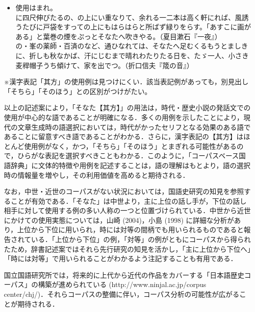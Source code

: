 \documentclass[japanese]{jnlp_1.4}
\begin{document}
\begin{itemize}
\begin{itemize}
\setlength{\fboxsep}{1pt}
\item[\textbullet]
使用はまれ。\\
に四尺伸びたるの、の上にい重なりて、余れる一二本は高く軒にれば、風誘うたびに戸袋をすっての上にもはらはらと所ばず緑りをらす。「あすこに画がある」と葉巻の煙をぷっと\colorbox[gray]{.9}{そなた}へ吹きやる。（夏目漱石『一夜』）\\
の・峯の薬師・百済のなど、通ひなれては、\colorbox[gray]{.9}{そなた}へ足むくるもうとましきに、折しも秋なかば、汗にじむまで晴れわたりたる日を、たゞ一人、小さき麦稈帽子うち傾けて、家を出でつ。（折口信夫『筬の音』）
\end{itemize}
※漢字表記「其方」の使用例は見つけにくい．該当表記例があっても，別見出し「そちら」「そのほう」との区別がつけがたい。
\end{itemize}

以上の記述案により，「そなた【其方】」の用法は，時代・歴史小説の発話文での使用が中心的な語であることが明確になる．多くの用例を示したことにより，現代の文章生成時の語選択においては，時代がかったセリフとなる効果のある語であることに留意すべき語であることがわかる．さらに，漢字表記の【其方】はほとんど使用例がなく，かつ，「そちら」「そのほう」とまぎれる可能性があるので，ひらがな表記を選択すべきこともわかる．このように，「コーパスベース国語辞典」に文体的特徴や用例を記述することは，語の理解はもとより，語の選択時の情報量を増やし，その利用価値を高めると期待される．

なお，中世・近世のコーパスがない状況においては，国語史研究の知見を参照することが有効である．「そなた」は中世より，主に上位の話し手が，下位の話し相手に対して使用する例の多い人称の一つと位置づけられている．中世から近世にかけての使用実態については，山崎 (2004)，小島 (1998) に詳細な分析があり，上位から下位に用いられ，時には対等の間柄でも用いられるものであると報告されている．「上位から下位」の例，「対等」の例がともにコーパスから得られたため，辞書記述案ではそれら先行研究の知見を活かし，「主に上位から下位へ」「時には対等」で用いられることがわかるよう注記することも有用である．

国立国語研究所では，将来的に上代から近代の作品をカバーする「日本語歴史コーパス」の構築が進められている (http://www.ninjal.ac.jp/corpus\textunderscore 
center/chj/)．それらコーパスの整備に伴い，コーパス分析の可能性が広がることが期待される．
\end{document}
